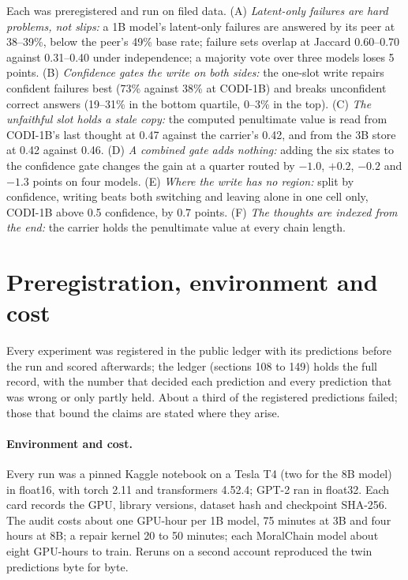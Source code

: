 Each was preregistered and run on filed data. (A) \emph{Latent-only failures are hard problems, not slips:} a 1B model's latent-only failures are answered by its peer at 38--39\%, below the peer's 49\% base rate; failure sets overlap at Jaccard 0.60--0.70 against 0.31--0.40 under independence; a majority vote over three models loses 5 points. (B) \emph{Confidence gates the write on both sides:} the one-slot write repairs confident failures best (73\% against 38\% at CODI-1B) and breaks unconfident correct answers (19--31\% in the bottom quartile, 0--3\% in the top). (C) \emph{The unfaithful slot holds a stale copy:} the computed penultimate value is read from CODI-1B's last thought at 0.47 against the carrier's 0.42, and from the 3B store at 0.42 against 0.46. (D) \emph{A combined gate adds nothing:} adding the six states to the confidence gate changes the gain at a quarter routed by $-1.0$, $+0.2$, $-0.2$ and $-1.3$ points on four models. (E) \emph{Where the write has no region:} split by confidence, writing beats both switching and leaving alone in one cell only, CODI-1B above 0.5 confidence, by 0.7 points. (F) \emph{The thoughts are indexed from the end:} the carrier holds the penultimate value at every chain length.

\section{Preregistration, environment and cost}\label{app:prereg}

Every experiment was registered in the public ledger with its predictions before the run and scored afterwards; the ledger (sections 108 to 149) holds the full record, with the number that decided each prediction and every prediction that was wrong or only partly held. About a third of the registered predictions failed; those that bound the claims are stated where they arise.

\paragraph{Environment and cost.} Every run was a pinned Kaggle notebook on a Tesla T4 (two for the 8B model) in float16, with torch 2.11 and transformers 4.52.4; GPT-2 ran in float32. Each card records the GPU, library versions, dataset hash and checkpoint SHA-256. The audit costs about one GPU-hour per 1B model, 75 minutes at 3B and four hours at 8B; a repair kernel 20 to 50 minutes; each MoralChain model about eight GPU-hours to train. Reruns on a second account reproduced the twin predictions byte for byte.

